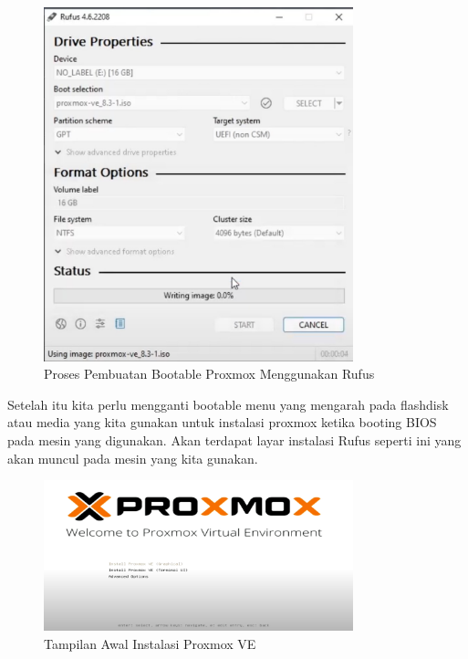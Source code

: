 \begin{figure}[H]
  \centering
  \includegraphics[width=0.8\textwidth]{figures/proxmox-install-rufus-1.jpg}
  \caption{Proses Pembuatan Bootable Proxmox Menggunakan Rufus}
  \label{fig:proxmox_rufus}
\end{figure}

Setelah itu kita perlu mengganti bootable menu yang mengarah pada flashdisk atau media yang kita gunakan untuk instalasi proxmox ketika booting BIOS pada mesin yang digunakan.
Akan terdapat layar instalasi Rufus seperti ini yang akan muncul pada mesin yang kita gunakan.

\begin{figure}[H]
  \centering
  \includegraphics[width=0.8\textwidth]{figures/proxmox-install-ui-2.jpg}
  \caption{Tampilan Awal Instalasi Proxmox VE}
  \label{fig:proxmox_install_ui}
\end{figure}

